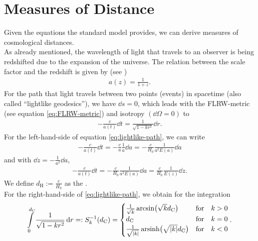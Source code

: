 \newpage
\section{Measures of Distance}

Given the equations the standard model provides, we can derive measures of cosmological distances. \\
As already mentioned, the wavelength of light that travels to an observer is being redshifted due to the expansion of the universe. The relation between the scale factor and the redshift is given by (see \cite[p.~9]{Bartelmann2019})
\begin{align}
    a(z) = \frac{1}{1 + z}.
\end{align}
For the path that light travels between two points (events) in spacetime (also called ``lightlike geodesics''), we have $\dd{s} = 0$, which leads with the FLRW-metric (see equation \eqref{eq:FLRW-metric}) and isotropy $(\dd{\Omega} = 0)$ to 
\begin{align}
    - \frac{c}{a(t)} \dd{t} = \frac{1}{\sqrt{1 - kr^2}} \dd{r}. \label{eq:lightlike-path} 
\end{align}
For the left-hand-side of equation \eqref{eq:lightlike-path}, we can write 
\begin{align}
    - \frac{c}{a(t)} \dd{t} = - \frac{c}{a} \frac{1}{\dot{a}} \dd{a} = - \frac{c}{H_{0}} \frac{1}{a^2 E(a)} \dd{a}
\end{align}
and with $\displaystyle \dd{z} = - \frac{1}{a^2} \dd{a}$, 
\begin{align}
    - \frac{c}{a(t)} \dd{t} = - \frac{c}{H_{0}} \frac{1}{a^2 E(a)} \dd{a} = \frac{c}{H_{0}} \frac{1}{E(z)} \dd{z}. \label{eq:RHS-lightlike-path}
\end{align}
We define $\displaystyle d_{\text{H}} := \frac{c}{H_{0}}$ as the . \\
For the right-hand-side of \eqref{eq:lightlike-path}, we obtain for the integration
\begin{align}
    \int\limits_{0}^{d_{\text{C}}} \frac{1}{\sqrt{1 - kr^2}} \dd{r} =: S^{-1}_{k}(d_{\text{C}}) = \begin{cases} \frac{1}{\sqrt{k}} \arcsin \bigl( \sqrt{k} d_{\text{C}} \bigr) &\text{for} \quad k > 0 \\ d_{\text{C}} &\text{for} \quad k = 0 \\ \frac{1}{\sqrt{\vert k \vert}} \operatorname{arsinh} \bigl(\sqrt{\vert k \vert} d_{\text{C}} \bigr) &\text{for} \quad k < 0 \end{cases}.
\end{align}
